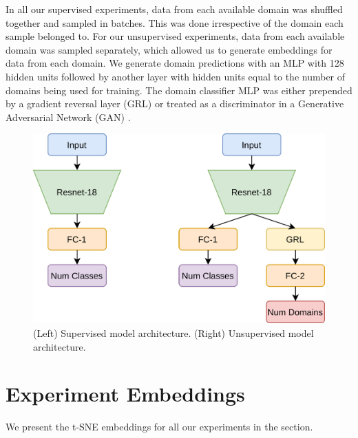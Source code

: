 \documentclass{article}
\begin{document}
In all our supervised experiments, data from each available domain was shuffled together and sampled in batches. This was done irrespective of the domain each sample belonged to. For our unsupervised experiments, data from each available domain was sampled separately, which allowed us to generate embeddings for data from each domain. We generate domain predictions with an MLP with 128 hidden units followed by another layer with hidden units equal to the number of domains being used for training. The domain classifier MLP was either prepended by a gradient reversal layer (GRL) \cite{ganin2016domain} or treated as a discriminator in a  Generative Adversarial Network (GAN) \cite{goodfellow2014generative}.

\begin{figure}[ht]
\includegraphics[width=\linewidth]{figures_supp/model.png} 
\caption{(Left) Supervised model architecture. (Right) Unsupervised model architecture.}
\label{model}
\end{figure}

\section{Experiment Embeddings}

We present the t-SNE embeddings for all our experiments in the section. 

\end{document}
